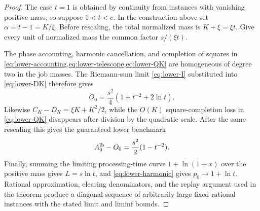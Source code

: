 \begin{proof}
The case $t=1$ is obtained by continuity from instances with vanishing
positive mass, so suppose $1<t<e$.  In the construction above set
$\alpha=t-1=K/\xi$.  Before rescaling, the total normalized mass is
$K+\xi=\xi t$.  Give every unit of normalized mass the common factor
$s/(\xi t)$.

The phase accounting, harmonic cancellation, and completion of squares in
\cref{eq:lower-accounting,eq:lower-telescope,eq:lower-QK} are homogeneous of
degree two in the job masses.  The Riemann-sum limit
\cref{eq:lower-I} substituted into \cref{eq:lower-DK} therefore gives
\[
 O_0=\frac{s^2}{4}(1+t^{-2}+2\ln t).
\]
Likewise $C_K-D_K=\xi K+K^2/2$, while the $O(K)$ square-completion loss in
\cref{eq:lower-QK} disappears after division by the quadratic scale.  After
the same rescaling this gives the guaranteed lower benchmark
\[
 A_0^{\rm lb}-O_0=\frac{s^2}{2}(1-t^{-2}).
\]
Finally, summing the limiting processing-time curve
$1+\ln(1+x)$ over the positive mass gives $L=s\ln t$, and
\cref{eq:lower-harmonic} gives $p_0\to1+\ln t$.  Rational approximation,
clearing denominators, and the replay argument used in the theorem produce a
diagonal sequence of arbitrarily large fixed rational instances with the
stated limit and liminf bounds.
\end{proof}

